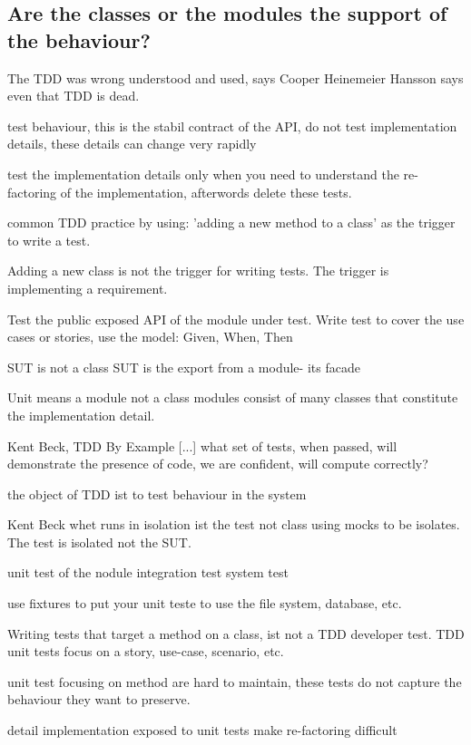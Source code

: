 \documentclass{article}
\begin{document}
\subsection{Are the classes or the modules the support of the behaviour?}

The TDD was wrong understood and used, says Cooper \cite{WEBSITE:WhereDidItAllGoWrong} 
Heinemeier Hansson \cite{WEBSITE:TDDisdead} says even that TDD is dead.

test behaviour, 
	this is the stabil contract of the API, 
do not test implementation details, 
	these details can change very rapidly

test the implementation details 
	only when you need to understand the re-factoring of the implementation,
	afterwords delete these tests.



common TDD practice by using: 
	'adding a new method to a class' 
	as the trigger to write a test.

Adding a new class is not the trigger for writing tests.
The trigger is implementing a requirement.

Test the public exposed API of the module under test.
Write test to cover the use cases or stories, use the model: Given, When, Then

SUT is not a class
SUT is the export from a module- its facade

Unit means a module not a class
modules consist of many classes that constitute the implementation detail.

Kent Beck, TDD By Example
[...] what set of tests, when passed, will demonstrate the presence of code, we are confident, will compute correctly?

the object of TDD ist to test behaviour in the system

Kent Beck whet runs in isolation ist the test not class using mocks to be isolates.
The test is isolated not the SUT.

unit test of the nodule
integration test
system test

use fixtures to put your unit teste to use the file system, database, etc.

Writing tests that target a method on a class, ist not a TDD developer test.
TDD unit tests focus on a story, use-case, scenario, etc.

unit test focusing on method are hard to maintain, 
	these tests do not capture the behaviour they want to preserve.
	
detail implementation exposed to unit tests make re-factoring difficult	
\end{document}
